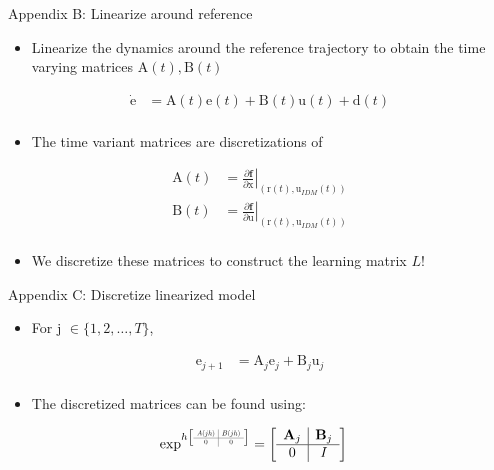 \documentclass[handout]{beamer}
\newcommand{\boldvec}[1]{\boldsymbol{\mathrm{#1}}}
\let\vec\boldvec
\newcommand\at[2]{\left.#1\right|_{#2}} %
\newcommand\scalemath[2]{\scalebox{#1}{\mbox{\ensuremath{\displaystyle #2}}}} %
\newcommand{\state}{\vec{x}} %
\newcommand{\error}{\vec{e}} %
\newcommand{\traj}{\vec{r}} %
\newcommand{\linDist}{\vec{d}} %
\newcommand{\sysInput}{\vec{u}} %
\begin{document}
%
\begin{frame}{Appendix B: Linearize around reference}
\begin{itemize}
\item Linearize the dynamics around the reference trajectory to obtain the time varying matrices $\vec{A}(t), \vec{B}(t)$
\end{itemize}
\begin{equation*}
\begin{aligned}
\dot{\error} &= \vec{A}(t)\error(t) + \vec{B}(t)\sysInput(t) + \linDist(t)\\
\end{aligned}
\end{equation*} 
\begin{itemize}
\item The time variant matrices are discretizations of 
\end{itemize}
\begin{equation*}
\begin{aligned}
\vec{A}(t) & = \at{\frac{\partial{\mathbf{f}}}{\partial{\state}}}{(\traj(t),\sysInput_{IDM}(t))} \\
\vec{B}(t) & = \at{\frac{\partial{\mathbf{f}}}{\partial{\sysInput}}}{(\traj(t),\sysInput_{IDM}(t))} \\
\end{aligned}
\end{equation*}
\begin{itemize}
\item We discretize these matrices to construct the learning matrix $L$! 
\end{itemize}
\end{frame}
%
\begin{frame}{Appendix C: Discretize linearized model}
\begin{itemize}
\item For j $\in \{ 1, 2, \ldots, T \}$, 
\end{itemize}
\begin{equation*}
\begin{aligned}
\error_{j+1} &= \vec{A}_j\error_j + \vec{B}_j\sysInput_j \\
\end{aligned}
\end{equation*}
\begin{itemize}
\item The discretized matrices can be found using: 
\linebreak
\end{itemize}
\begin{equation*}
\begin{aligned}
\exp^{h
\left[
\scalemath{0.5}{
\begin{array}{c|c}
A(jh) & B(jh) \\ \hline
0 & 0
\end{array}}\right]}
&= 
\left[
\begin{array}{c|c}
\vec{A}_j & \vec{B}_j \\ \hline
0 & I
\end{array}\right]
\end{aligned}
\end{equation*}
\end{frame}
%
\end{document}
